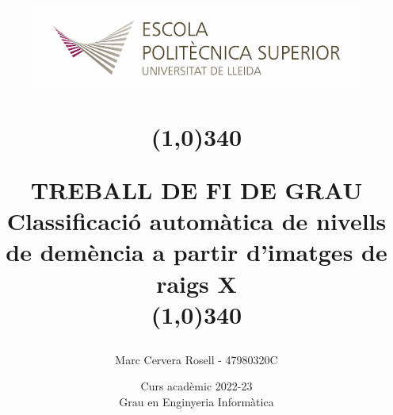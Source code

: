 \title{
	\begin{center}
	\vspace{3cm}
	\includegraphics[width=11cm, height=3cm]{images/Logo-nou-eps.jpg}
	\end{center}
	\begin{center}
	\line(1,0){340}
	\end{center}		
	TREBALL DE FI DE GRAU\\
	\vspace{2mm}
	\Large Classificació automàtica de nivells de demència a partir d'imatges de raigs X\\
	\line(1,0){340}
	\vspace{2.5cm}
	}

\author{Marc Cervera Rosell - 47980320C \vspace{1cm}}


\date{Curs acadèmic 2022-23\vspace{0.5cm} \\Grau en Enginyeria Informàtica}